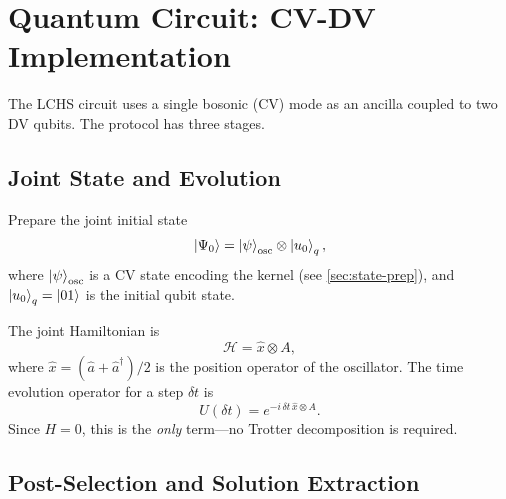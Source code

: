 \documentclass[11pt]{article}
\begin{document}
\section{Quantum Circuit: CV-DV Implementation}

The LCHS circuit uses a single bosonic (CV) mode as an ancilla coupled to
two DV qubits.  The protocol has three stages.

\subsection{Joint State and Evolution}

Prepare the joint initial state
\begin{equation}\label{eq:joint-init}
  \ket{\Psi_0} = \ket{\psi}_{\mathrm{osc}} \otimes \ket{u_0}_q,
\end{equation}
where $\ket{\psi}_{\mathrm{osc}}$ is a CV state encoding the kernel (see
\cref{sec:state-prep}), and $\ket{u_0}_q = \ket{01}$ is the initial
qubit state.

The joint Hamiltonian is
\begin{equation}\label{eq:joint-ham}
  \mathcal{H} = \hat{x} \otimes A,
\end{equation}
where $\hat{x} = (\hat{a}+\hat{a}^\dagger)/2$ is the position operator of the
oscillator.  The time evolution operator for a step $\delta t$ is
\begin{equation}\label{eq:U-step}
  U(\delta t) = e^{-i\,\delta t\,\hat{x}\otimes A}.
\end{equation}
Since $H=0$, this is the \emph{only} term---no Trotter decomposition is
required.

\subsection{Post-Selection and Solution Extraction}
\end{document}
